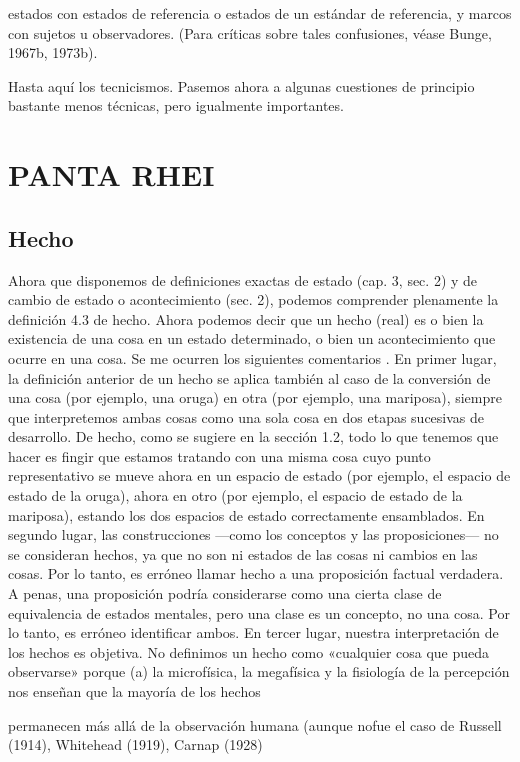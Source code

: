 \begin{justifying}
  
      \noindent
      estados con estados de referencia o estados de un estándar de referencia, y
  marcos con sujetos u observadores. (Para críticas sobre tales confusiones, véase
  Bunge, 1967b, 1973b).

  Hasta aquí los tecnicismos. Pasemos ahora a algunas cuestiones de principio bastante menos técnicas,
  pero igualmente importantes.
  \bigskip
  \section{\centering PANTA RHEI}
    \subsection{Hecho}
    
  Ahora que disponemos de definiciones exactas de estado (cap. 3, sec. 2) y de
  cambio de estado o acontecimiento (sec. 2), podemos comprender plenamente la definición
  4.3 de hecho. Ahora podemos decir que un hecho (real) es o bien la existencia de una cosa
  en un estado determinado, o bien un acontecimiento que ocurre en una cosa. Se me ocurren los siguientes comentarios
  .
  En primer lugar, la definición anterior de un hecho se aplica también al caso de la
  conversión de una cosa (por ejemplo, una oruga) en otra (por ejemplo, una mariposa),
  siempre que interpretemos ambas cosas como una sola cosa en dos etapas sucesivas
  de desarrollo. De hecho, como se sugiere en la sección 1.2, todo lo que tenemos que hacer
  es fingir que estamos tratando con una misma cosa cuyo
  punto representativo se mueve ahora en un espacio de estado (por ejemplo, el espacio de estado de la oruga),
  ahora en otro (por ejemplo, el espacio de estado de la mariposa), estando los dos espacios de estado
  correctamente ensamblados.
  En segundo lugar, las construcciones —como los conceptos y las proposiciones— no
  se consideran hechos, ya que no son ni estados de las cosas ni cambios en
  las cosas. Por lo tanto, es erróneo llamar hecho a una proposición factual verdadera. A
  penas, una proposición podría considerarse como una cierta clase de equivalencia de
  estados mentales, pero una clase es un concepto, no una cosa. Por lo tanto, es erróneo
  identificar ambos.
  En tercer lugar, nuestra interpretación de los hechos es objetiva. No definimos un hecho como
  «cualquier cosa que pueda observarse» porque (a) la microfísica,
  la megafísica y la fisiología de la percepción nos enseñan que la mayoría de los hechos

  permanecen más allá de la observación humana (aunque nofue el caso de Russell (1914), Whitehead (1919), Carnap (1928)


\end{justifying}
